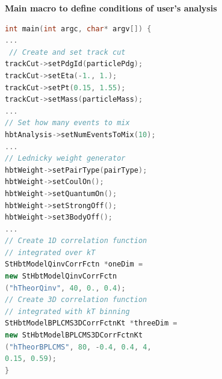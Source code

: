 \documentclass[dvipsnames] {beamer}
\begin{document}
\begin{frame}[fragile]
\begin{columns}[t]
          \begin{block}{\bf \centering \tiny Main macro to define conditions of user's analysis}
            \vskip -0.33cm
                   {\tiny
                     \begin{lstlisting}[language=C++,basicstyle=\tiny\ttfamily,keywordstyle=\color{darkred!70!black}]
int main(int argc, char* argv[]) {
...
 // Create and set track cut
trackCut->setPdgId(particlePdg);
trackCut->setEta(-1., 1.);
trackCut->setPt(0.15, 1.55);
trackCut->setMass(particleMass);
...
// Set how many events to mix
hbtAnalysis->setNumEventsToMix(10);
...
// Lednicky weight generator
hbtWeight->setPairType(pairType);
hbtWeight->setCoulOn();
hbtWeight->setQuantumOn();
hbtWeight->setStrongOff();
hbtWeight->set3BodyOff();
...
// Create 1D correlation function
// integrated over kT
StHbtModelQinvCorrFctn *oneDim =
new StHbtModelQinvCorrFctn
("hTheorQinv", 40, 0., 0.4);
// Create 3D correlation function
// integrated with kT binning
StHbtModelBPLCMS3DCorrFctnKt *threeDim =
new StHbtModelBPLCMS3DCorrFctnKt
("hTheorBPLCMS", 80, -0.4, 0.4, 4,
0.15, 0.59);
}
\end{lstlisting}
}
\end{block}
\end{columns}     
      \end{frame}
\end{document}
